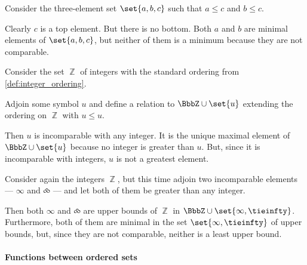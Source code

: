 \begin{example}
\begin{thmenum}
     Consider the three-element set \( \set{ a, b, c } \) such that \( a \leq c \) and \( b \leq c \).

    Clearly \( c \) is a top element. But there is no bottom. Both \( a \) and \( b \) are minimal elements of \( \set{ a, b, c } \), but neither of them is a minimum because they are not comparable.

     Consider the set \( \BbbZ \) of integers with the standard ordering from \cref{def:integer_ordering}.

    Adjoin some symbol \( u \) and define a relation to \( \BbbZ \cup \set{ u } \) extending the ordering on \( \BbbZ \) with \( u \leq u \).

    Then \( u \) is incomparable with any integer. It is the unique maximal element of \( \BbbZ \cup \set{ u } \) because no integer is greater than \( u \). But, since it is incomparable with integers, \( u \) is not a greatest element.

     Consider again the integers \( \BbbZ \), but this time adjoin two incomparable elements --- \( \infty \) and \( \tieinfty \) --- and let both of them be greater than any integer.

    Then both \( \infty \) and \( \tieinfty \) are upper bounds of \( \BbbZ \) in \( \BbbZ \cup \set{ \infty, \tieinfty } \). Furthermore, both of them are minimal in the set \( \set{ \infty, \tieinfty } \) of upper bounds, but, since they are not comparable, neither is a least upper bound.
  \end{thmenum}
\end{example}

\paragraph{Functions between ordered sets}

